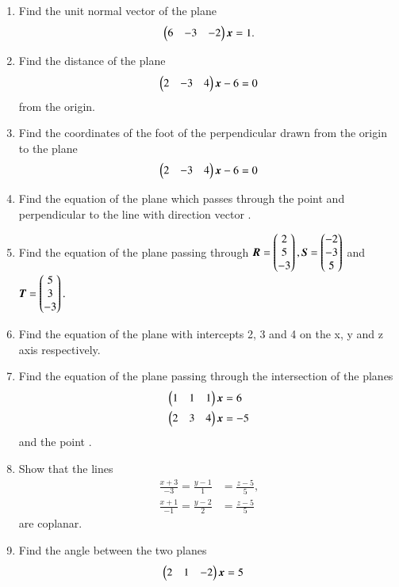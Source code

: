 \begin{enumerate}[label=\arabic*.,ref=\thesubsection.\theenumi]
\item Find the unit normal vector of the plane 
\begin{align}
\begin{pmatrix}6 & -3 & -2\end{pmatrix}\bm{x}  = 1.
\end{align}
\item Find the distance of the plane 
\begin{align}
\begin{pmatrix}2 & -3 & 4\end{pmatrix}\bm{x}-6  = 0
\end{align}
%
from the origin.
\item Find the coordinates of the foot of the perpendicular drawn from the origin to the plane 
\begin{align}
\begin{pmatrix}2 & -3 & 4\end{pmatrix}\bm{x}-6  = 0
\end{align}
%
\item Find the equation of the plane which passes through the point  and perpendicular to the line with direction vector .
\item Find the equation of the plane passing through 
$
\bm{R} = \begin{pmatrix}2\\5\\-3\end{pmatrix},
\bm{S}= \begin{pmatrix}-2\\-3\\5\end{pmatrix}
$ 
and 
$
\bm{T}= \begin{pmatrix}5\\3\\-3\end{pmatrix}.
$
\item Find the equation of the plane with intercepts 2, 3 and 4 on the x, y and z axis respectively.
\item Find the equation of the plane passing through the intersection of the planes 
\begin{align}
\begin{pmatrix}1 & 1 & 1\end{pmatrix}\bm{x}&=6  
\\
\begin{pmatrix}2 & 3 & 4\end{pmatrix}\bm{x}&=-5
\end{align}
%
and the point .
\item Show that the lines 
\begin{align}
\frac{x+3}{-3} = \frac{y-1}{1} &= \frac{z-5}{5}, 
\\
\frac{x+1}{-1} = \frac{y-2}{2} &= \frac{z-5}{5} 
\end{align}
%
are coplanar.
\item Find the angle between the two planes
\begin{align}
\myvec{2 & 1 & -2}\bm{x}&=5

\end{align}
\end{enumerate}
